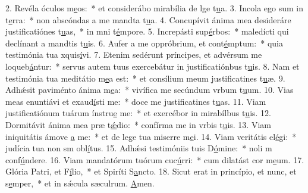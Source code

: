 2. Revéla óculos m\uline{e}os:~* et considerábo mirabília de lge t\uline{u}a.
3. Incola ego sum in t\uline{e}rra:~* non abscóndas a me mandta t\uline{u}a.
4. Concupívit ánima mea desideráre justificatiónes t\uline{u}as,~* in mni t\uline{é}mpore.
5. Increpásti sup\uline{é}rbos:~* maledícti qui declínant a mandtis t\uline{u}is.
6. Aufer a me oppróbrium, et cont\uline{é}mptum:~* quia testimónia tua xquis\uline{í}vi.
7. Etenim sedérunt príncipes, et advérsum me loqueb\uline{á}ntur:~* servus autem tuus exercebátur in justificatiónbus t\uline{u}is.
8. Nam et testimónia tua meditátio m\uline{e}a est:~* et consílium meum justificatines t\uline{u}æ.
9. Adhǽsit paviménto ánima m\uline{e}a:~* vivífica me secúndum vrbum t\uline{u}um.
10. Vias meas enuntiávi et exaud\uline{í}sti me:~* doce me justificatines t\uline{u}as.
11. Viam justificatiónum tuárum ínstru\uline{e} me:~* et exercébor in mirabílbus t\uline{u}is.
12. Dormitávit ánima mea præ t\uline{ǽ}dio:~* confírma me in vrbis t\uline{u}is.
13. Viam iniquitátis ámove \uline{a} me:~* et de lege tua miserre m\uline{e}i.
14. Viam veritátis el\uline{é}gi:~* judícia tua non sm obl\uline{í}tus.
15. Adhǽsi testimóniis tuis D\uline{ó}mine:~* noli m conf\uline{ú}ndere.
16. Viam mandatórum tuórum cuc\uline{ú}rri:~* cum dilatást cor m\uline{e}um.
17. Glória Patri, et F\uline{í}lio,~* et Spiríti S\uline{a}ncto.
18. Sicut erat in princípio, et nunc, et s\uline{e}mper,~* et in sǽcula sæculrum. \uline{A}men.
